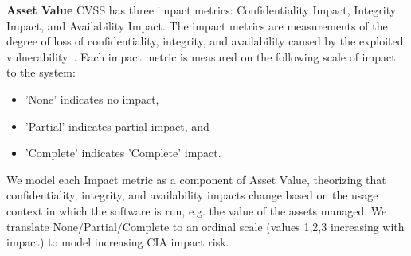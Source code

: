 \textbf{Asset Value}
CVSS has three impact metrics: Confidentiality Impact, Integrity Impact, and Availability Impact. The impact metrics are measurements of the degree of loss of confidentiality, integrity, and availability caused by the exploited vulnerability~\cite{mell2007complete}. Each impact metric is measured on the following scale of impact to the system:
	\begin{itemize}
		\item 'None' indicates no impact, 
		\item 'Partial' indicates partial impact, and 
		\item 'Complete' indicates 'Complete' impact.  
	\end{itemize}
We model each Impact metric as a component of Asset Value, theorizing that confidentiality, integrity, and availability impacts change based on the usage context in which the software is run, e.g. the value of the assets managed. We translate None/Partial/Complete to an ordinal scale (values 1,2,3 increasing with impact) to model increasing CIA impact risk.


